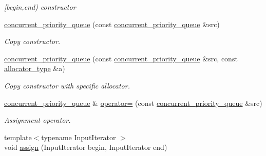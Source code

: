 \begin{DoxyCompactItemize}
\begin{DoxyCompactList}\small\item\em \mbox{[}begin,end) constructor \end{DoxyCompactList}\item 
\hyperlink{classtbb_1_1interface5_1_1concurrent__priority__queue_a332d26234f9c37a6b7ba269c648815d0}{concurrent\+\_\+priority\+\_\+queue} (const \hyperlink{classtbb_1_1interface5_1_1concurrent__priority__queue}{concurrent\+\_\+priority\+\_\+queue} \&src)
\begin{DoxyCompactList}\small\item\em Copy constructor. \end{DoxyCompactList}\item 
\hyperlink{classtbb_1_1interface5_1_1concurrent__priority__queue_aa52cea369b6630699ee78cc42622be9d}{concurrent\+\_\+priority\+\_\+queue} (const \hyperlink{classtbb_1_1interface5_1_1concurrent__priority__queue}{concurrent\+\_\+priority\+\_\+queue} \&src, const \hyperlink{classtbb_1_1interface5_1_1concurrent__priority__queue_a1d2cebf242fa83d88eebdc3ad6891fb1}{allocator\+\_\+type} \&a)
\begin{DoxyCompactList}\small\item\em Copy constructor with specific allocator. \end{DoxyCompactList}\item 
\hyperlink{classtbb_1_1interface5_1_1concurrent__priority__queue}{concurrent\+\_\+priority\+\_\+queue} \& \hyperlink{classtbb_1_1interface5_1_1concurrent__priority__queue_ac0c3f41b10f04547f3438517c40cf8a5}{operator=} (const \hyperlink{classtbb_1_1interface5_1_1concurrent__priority__queue}{concurrent\+\_\+priority\+\_\+queue} \&src)
\begin{DoxyCompactList}\small\item\em Assignment operator. \end{DoxyCompactList}\item 
\hypertarget{classtbb_1_1interface5_1_1concurrent__priority__queue_ac64c7b627708f0d6b2e5421fb0d49150}{}{\footnotesize template$<$typename Input\+Iterator $>$ }\\void \hyperlink{classtbb_1_1interface5_1_1concurrent__priority__queue_ac64c7b627708f0d6b2e5421fb0d49150}{assign} (Input\+Iterator begin, Input\+Iterator end)\label{classtbb_1_1interface5_1_1concurrent__priority__queue_ac64c7b627708f0d6b2e5421fb0d49150}


\end{DoxyCompactItemize}
